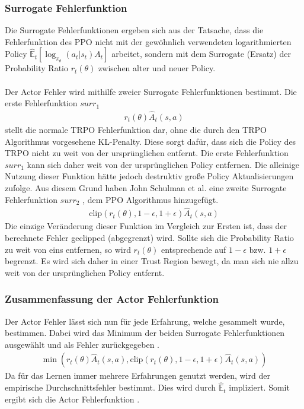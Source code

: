 \subsubsection{Surrogate Fehlerfunktion} \label{subsubsec:Grundlagen_Surrogate_Fehlerfunktion}
Die Surrogate Fehlerfunktionen ergeben sich aus der Tatsache, dass die Fehlerfunktion des PPO nicht mit der gewöhnlich verwendeten logarithmierten Policy $\mathbb{\hat{E}}_t[\log_{\pi_{\theta}}(a_t|s_t)A_t]$ arbeitet, sondern mit dem Surrogate (Ersatz) der Probability Ratio $r_{t}(\theta)$  zwischen alter und neuer Policy. \citep{TRPO}\\
\\Der Actor Fehler wird mithilfe zweier Surrogate Fehlerfunktionen bestimmt. Die erste Fehlerfunktion $surr_1$ 
\begin{align}
	r_{t}(\theta) \hat{A}_{t}(s, a)
	\label{eq:Grundlagen_surrogate_1}
\end{align}
stellt die normale TRPO Fehlerfunktion dar, ohne die durch den TRPO Algorithmus vorgesehene KL-Penalty. Diese sorgt dafür, dass sich die Policy des TRPO nicht zu weit von der ursprünglichen entfernt. Die erste Fehlerfunktion $surr_1$ kann sich daher weit von der ursprünglichen Policy entfernen.\citep[S. 3 f.]{PPO}
Die alleinige Nutzung dieser Funktion hätte jedoch destruktiv große Policy Aktualisierungen zufolge. Aus diesem Grund haben John Schulman et al. eine zweite Surrogate Fehlerfunktion $surr_2$ , dem PPO Algorithmus hinzugefügt. 
\begin{align}
	\label{eq:Grundlagen_surrogate_2}
	\text{clip}(r_{t}(\theta), 1 - \epsilon, 1 + \epsilon) \hat{A}_{t}(s, a)
\end{align}
Die einzige Veränderung dieser Funktion im Vergleich zur Ersten ist, dass der berechnete Fehler geclipped (abgegrenzt) wird. Sollte sich die Probability Ratio zu weit von eins entfernen, so wird $r_{t}(\theta)$ entsprechende auf $1 - \epsilon \text{ bzw. } 1 + \epsilon$ begrenzt. Es wird sich daher in einer Trust Region bewegt, da man sich nie allzu weit von der ursprünglichen Policy entfernt. \citep{TRPO, PPO}

\subsubsection{Zusammenfassung der Actor Fehlerfunktion} \label{subsubsec:Grundlagen_PPO_Actor_Loss}
Der Actor Fehler lässt sich nun für jede Erfahrung, welche gesammelt wurde, bestimmen. Dabei wird das Minimum der beiden Surrogate Fehlerfunktionen ausgewählt und als Fehler zurückgegeben .
\begin{align}
	\min(r_{t}(\theta) \hat{A}_{t}(s, a), \text{clip}(r_{t}(\theta), 1 - \epsilon, 1 + \epsilon) \hat{A}_{t}(s, a))
	\label{eq:Grundlagen_Actor_Loss_Single}
\end{align}
Da für das Lernen immer mehrere Erfahrungen genutzt werden, wird der empirische Durchschnittsfehler bestimmt. Dies wird durch $\mathbb{\hat{E}}_{t}$ impliziert. Somit ergibt sich die Actor Fehlerfunktion . \citep[S. 3f.]{PPO}\\

